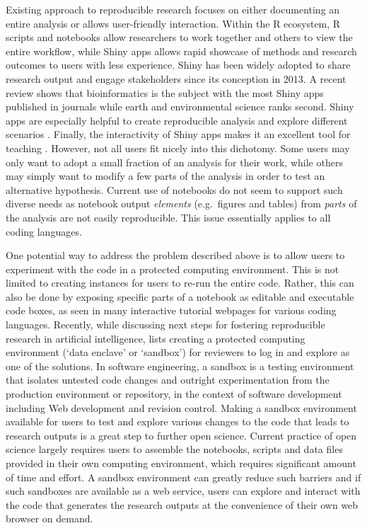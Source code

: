 Existing approach to reproducible research focuses on either documenting
an entire analysis or allows user-friendly interaction. Within the R
ecosystem, R scripts and notebooks allow researchers to work together
and others to view the entire workflow, while Shiny apps \citep{shiny}
allows rapid showcase of methods and research outcomes to users with
less experience. Shiny has been widely adopted to share research output
and engage stakeholders since its conception in 2013. A recent review
\citep{Kasprzak} shows that bioinformatics is the subject with the most
Shiny apps published in journals while earth and environmental science
ranks second. Shiny apps are especially helpful to create reproducible
analysis \citep[e.g.~examples in][]{Hollaway2020} and explore different
scenarios \citep[e.g.][]{Whateley2015, Mose2018}. Finally, the
interactivity of Shiny apps makes it an excellent tool for teaching
\citep[e.g.][]{Williams2017, adventr}. However, not all users fit nicely
into this dichotomy. Some users may only want to adopt a small fraction
of an analysis for their work, while others may simply want to modify a
few parts of the analysis in order to test an alternative hypothesis.
Current use of notebooks do not seem to support such diverse needs as
notebook output \emph{elements} (e.g.~figures and tables) from
\emph{parts} of the analysis are not easily reproducible. This issue
essentially applies to all coding languages.

One potential way to address the problem described above is to allow
users to experiment with the code in a protected computing environment.
This is not limited to creating instances for users to re-run the entire
code. Rather, this can also be done by exposing specific parts of a
notebook as editable and executable code boxes, as seen in many
interactive tutorial webpages for various coding languages. Recently,
while discussing next steps for fostering reproducible research in
artificial intelligence, \citet{Carter2019} lists creating a protected
computing environment (`data enclave' or `sandbox') for reviewers to log
in and explore as one of the solutions. In software engineering, a
sandbox is a testing environment that isolates untested code changes and
outright experimentation from the production environment or repository,
in the context of software development including Web development and
revision control. Making a sandbox environment available for users to
test and explore various changes to the code that leads to research
outputs is a great step to further open science. Current practice of
open science largely requires users to assemble the notebooks, scripts
and data files provided in their own computing environment, which
requires significant amount of time and effort. A sandbox environment
can greatly reduce such barriers and if such sandboxes are available as
a web service, users can explore and interact with the code that
generates the research outputs at the convenience of their own web
browser on demand.

